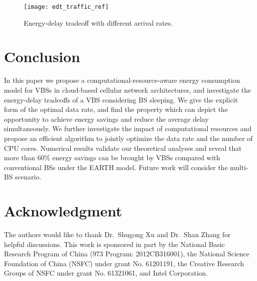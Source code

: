 \documentclass[conference]{IEEEtran}
\begin{document}
\begin{figure}[!t]
  \centering
  \texttt{[image: edt\_traffic\_ref]}
  \caption{Energy-delay tradeoff with different arrival rates.}
  \label{fig:edt-traffic}
\end{figure}

\section{Conclusion}
\label{sec:con}

In this paper we propose a computational-resource-aware energy consumption
model for VBSs in cloud-based cellular network architectures, and
investigate the energy-delay tradeoffs of a VBS considering BS sleeping.
We give the explicit form of the optimal data rate, and find the property which
can depict the opportunity
to achieve energy savings and reduce the average delay simultaneously.  We
further investigate the impact of computational resources and propose an
efficient algorithm to jointly optimize the data rate and
the number of CPU cores. Numerical results validate our theoretical analyses and reveal
that more than 60\% energy savings can be brought by VBSs compared with
conventional BSs under the EARTH model.  Future work will consider
the multi-BS scenario.

\section*{Acknowledgment}

The authors would like to thank Dr.~Shugong Xu and Dr.~Shan Zhang for
helpful discussions.
This work is sponsored in part by the National Basic Research Program of China
(973 Program: 2012CB316001), the National Science Foundation of China (NSFC)
under grant No. 61201191, the Creative Research Groups of NSFC under grant No.
61321061, and Intel Corporation.
\end{document}
